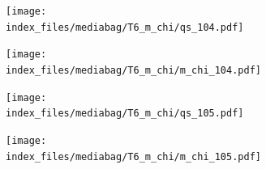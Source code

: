 \documentclass[
  11pt,
  letterpaper,
]{scrreprt}
\begin{document}
\begin{figure}

\begin{minipage}{0.50\linewidth}

\begin{figure}[H]

{\centering \texttt{[image: index\_files/mediabag/T6\_m\_chi/qs\_104.pdf]}

}


\end{figure}%

\end{minipage}%
%
\begin{minipage}{0.50\linewidth}

\begin{figure}[H]

{\centering \texttt{[image: index\_files/mediabag/T6\_m\_chi/m\_chi\_104.pdf]}

}


\end{figure}%

\end{minipage}%

\end{figure}%

\begin{figure}

\begin{minipage}{0.50\linewidth}

\begin{figure}[H]

{\centering \texttt{[image: index\_files/mediabag/T6\_m\_chi/qs\_105.pdf]}

}


\end{figure}%

\end{minipage}%
%
\begin{minipage}{0.50\linewidth}

\begin{figure}[H]

{\centering \texttt{[image: index\_files/mediabag/T6\_m\_chi/m\_chi\_105.pdf]}

}


\end{figure}%

\end{minipage}%

\end{figure}%
\end{document}
